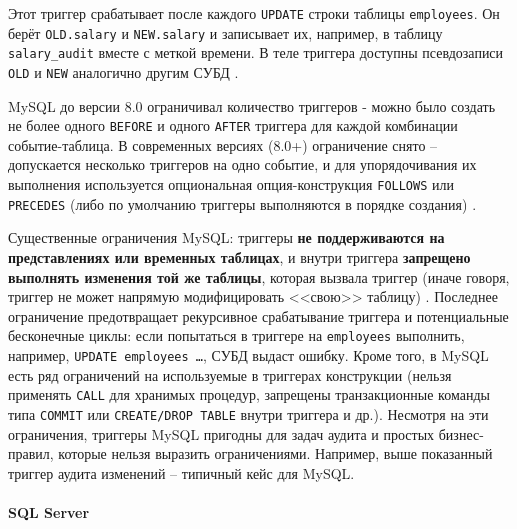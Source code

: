  Этот триггер срабатывает после каждого \texttt{UPDATE} строки таблицы \texttt{employees}. Он берёт \texttt{OLD.salary} и \texttt{NEW.salary} и записывает их, например, в таблицу \texttt{salary\_audit} вместе с меткой времени. В теле триггера доступны псевдозаписи \texttt{OLD} и \texttt{NEW} аналогично другим СУБД \autocite{Mysqldoc5}. 
 
 MySQL до версии 8.0 ограничивал количество триггеров - можно было создать не более одного \texttt{BEFORE} и одного \texttt{AFTER} триггера для каждой комбинации событие-таблица. В современных версиях (8.0+) ограничение снято – допускается несколько триггеров на одно событие, и для упорядочивания их выполнения используется опциональная опция-конструкция \texttt{FOLLOWS} или \texttt{PRECEDES} (либо по умолчанию триггеры выполняются в порядке создания) \autocite{Mysqldoc5}.
 
 Существенные ограничения MySQL: триггеры \textbf{не поддерживаются на представлениях или временных таблицах}, и внутри триггера \textbf{запрещено выполнять изменения той же таблицы}, которая вызвала триггер (иначе говоря, триггер не может напрямую модифицировать <<свою>> таблицу) \autocite{Mysqldoc6}. Последнее ограничение предотвращает рекурсивное срабатывание триггера и потенциальные бесконечные циклы: если попытаться в триггере на \texttt{employees} выполнить, например, \texttt{UPDATE employees \ldots}, СУБД выдаст ошибку. Кроме того, в MySQL есть ряд ограничений на используемые в триггерах конструкции (нельзя применять \texttt{CALL} для хранимых процедур, запрещены транзакционные команды типа \texttt{COMMIT} или \texttt{CREATE/DROP TABLE} внутри триггера и др.). Несмотря на эти ограничения, триггеры MySQL пригодны для задач аудита и простых бизнес-правил, которые нельзя выразить ограничениями. Например, выше показанный триггер аудита изменений – типичный кейс для MySQL.

 \paragraph{\textbf{SQL Server}} ~\\

